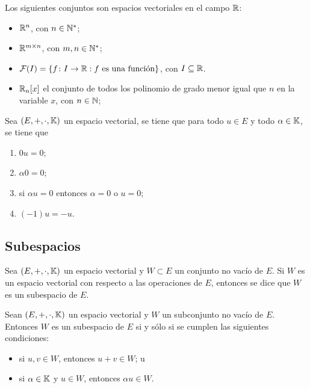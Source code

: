 \documentclass[a4,11pt]{aleph-notas}
\begin{document}
\begin{teo}
    Los siguientes conjuntos son espacios vectoriales en el campo $\R$:
    \begin{itemize}
    \item
        $\R^n$, con $n\in \N^*$;
    \item
        $\Mat[\R]{m}{n}$, con $m,n\in \N^*$;
    \item
        $\mathcal{F}(I)=\{\func{f}{I}{\R}: f\text{ es una función}\}$, con $I\subseteq \R$.
    \item
        $\R_n[x]$ el conjunto de todos los polinomio de grado menor igual que $n$ en la variable $x$, con $n\in \N$;
    \end{itemize}
\end{teo}

\begin{teo}
    Sea $(E,+,\cdot,\K)$ un espacio vectorial, se tiene que para todo $u \in E$ y todo $\alpha \in \K$, se tiene que
    \begin{enumerate}
        \item $0u = 0$;
        \item $\alpha 0 = 0$;
        \item si $\alpha u=0$ entonces $\alpha  = 0$ o $u = 0$;
        \item $(-1) u = -u$.
    \end{enumerate}
\end{teo}

\subsection{Subespacios}

\begin{defi}
    Sea $(E,+,\cdot,\K)$ un espacio vectorial y $W \subset E$ un conjunto no vacío de $E$. Si $W$ es un espacio vectorial con respecto a las operaciones de $E$, entonces se dice que $W$ es un subespacio de $E$.
\end{defi}

\begin{teo}
    Sean $(E,+,\cdot,\K)$ un espacio vectorial y $W$ un subconjunto no vacío de $E$. Entonces $W$ es un subespacio de $E$ si y sólo si se cumplen las siguientes condiciones:
    \begin{itemize}
    \item 
        si $u,v \in W$, entonces $u + v \in W$; u
    \item 
        si $\alpha \in \K$ y $u \in W$, entonces $\alpha u \in W$.
    \end{itemize}
\end{teo}
\end{document}
